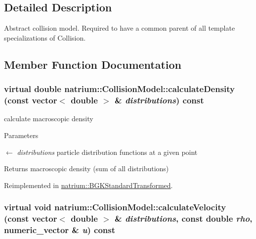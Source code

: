 \subsection{Detailed Description}
Abstract collision model. Required to have a common parent of all template specializations of Collision. 

\subsection{Member Function Documentation}
\hypertarget{classnatrium_1_1CollisionModel_ae1c879c87ac210a227a8e3da2d0ac385}{
\subsubsection[{calculateDensity}]{\setlength{\rightskip}{0pt plus 5cm}virtual double natrium::CollisionModel::calculateDensity (const vector$<$ double $>$ \& {\em distributions}) const}}
\label{classnatrium_1_1CollisionModel_ae1c879c87ac210a227a8e3da2d0ac385}


calculate macroscopic density 
\begin{DoxyParams}{Parameters}
\item[\mbox{$\leftarrow$} {\em distributions}]particle distribution functions at a given point \end{DoxyParams}
\begin{DoxyReturn}{Returns}
macroscopic density (sum of all distributions) 
\end{DoxyReturn}


Reimplemented in \hyperlink{classnatrium_1_1BGKStandardTransformed_a58c4dc0c67ff4898c6555b614afc1ace}{natrium::BGKStandardTransformed}.\hypertarget{classnatrium_1_1CollisionModel_a667f0e36da1bfb1c5102adb8f3afdcde}{
\subsubsection[{calculateVelocity}]{\setlength{\rightskip}{0pt plus 5cm}virtual void natrium::CollisionModel::calculateVelocity (const vector$<$ double $>$ \& {\em distributions}, \/  const double {\em rho}, \/  {\bf numeric\_\-vector} \& {\em u}) const}}
\label{classnatrium_1_1CollisionModel_a667f0e36da1bfb1c5102adb8f3afdcde}


